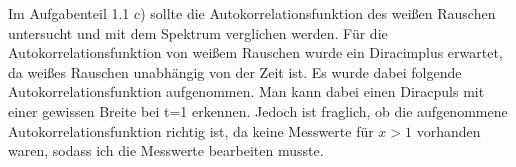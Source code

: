 \documentclass{article}						%
\begin{document}
		Im Aufgabenteil 1.1 c) sollte die Autokorrelationsfunktion des weißen Rauschen untersucht und mit dem Spektrum verglichen werden. Für die Autokorrelationsfunktion von weißem Rauschen wurde ein Diracimplus erwartet, da weißes Rauschen unabhängig von der Zeit ist. Es wurde dabei folgende Autokorrelationsfunktion aufgenommen. Man kann dabei einen Diracpuls mit einer gewissen Breite bei t=\SI{1}{\sec} erkennen. Jedoch ist fraglich, ob die aufgenommene Autokorrelationsfunktion richtig ist, da keine Messwerte für $ x>1 $ vorhanden waren, sodass ich die Messwerte bearbeiten musste.
		\clearpage
		
		\begin{figure}[h!]
		\end{figure}
		
\end{document}
